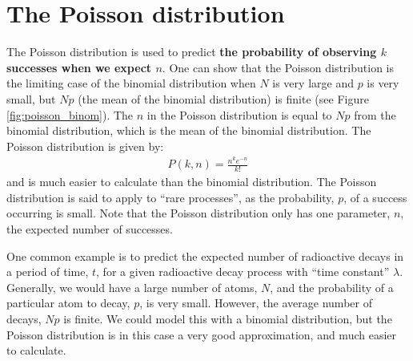 \begin{example}{}

\end{example}

\section{The Poisson distribution}
The Poisson distribution is used to predict \textbf{the probability of observing $k$ successes when we expect $n$}. One can show that the Poisson distribution is the limiting case of the binomial distribution when $N$ is very large and $p$ is very small, but $Np$ (the mean of the binomial distribution) is finite (see Figure \ref{fig:poisson_binom}). The $n$ in the Poisson distribution is equal to $Np$ from the binomial distribution, which is the mean of the binomial distribution. The Poisson distribution is given by:
\begin{align*}
 P(k,n)=\frac{n^k e^{-n}}{k!} 
\end{align*}  
and is much easier to calculate than the binomial distribution. The Poisson distribution is said to apply to ``rare processes'', as the probability, $p$, of a success occurring is small. Note that the Poisson distribution only has one parameter, $n$, the expected number of successes. 

One common example is to predict the expected number of radioactive decays in a period of time, $t$, for a given radioactive decay process with ``time constant'' $\lambda$. Generally, we would have a large number of atoms, $N$, and the probability of a particular atom to decay, $p$, is very small. However, the average number of decays, $Np$ is finite. We could model this with a binomial distribution, but the Poisson distribution is in this case a very good approximation, and much easier to calculate.

